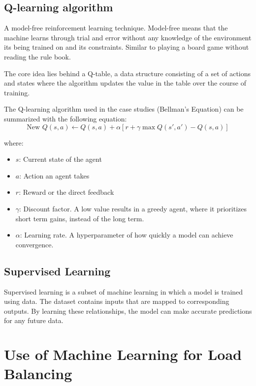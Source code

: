 \documentclass[conference]{IEEEtran}
\begin{document}
\subsection*{Q-learning algorithm}

A model-free reinforcement learning technique. Model-free means that the machine learns through trial and error without any knowledge of the environment its being trained on and its constraints. Similar to playing a board game without reading the rule book.

The core idea lies behind a Q-table, a data structure consisting of a set of actions and states where the algorithm updates the value in the table over the course of training.

The Q-learning algorithm used in the case studies (Bellman's Equation) can be summarized with the following equation:
\[
\text{New }Q(s,a) \leftarrow Q(s,a) + \alpha [r + \gamma \; \text{max} \; Q(s\prime, a\prime) - Q(s,a)]
\]

where:

\begin{itemize}
    \item $s$: Current state of the agent
    \item $a$: Action an agent takes
    \item $r$: Reward or the direct feedback
    \item $\gamma$: Discount factor. A low value results in a greedy agent, where it prioritizes short term gains, instead of the long term.
    \item $\alpha$: Learning rate. A hyperparameter of how quickly a model can achieve convergence. 
\end{itemize}

\subsection*{Supervised Learning}

Supervised learning is a subset of machine learning in which a model is trained using data. The dataset contains inputs that are mapped to corresponding outputs. By learning these relationships, the model can make accurate predictions for any future data.


\section{Use of Machine Learning for Load Balancing}
\end{document}
